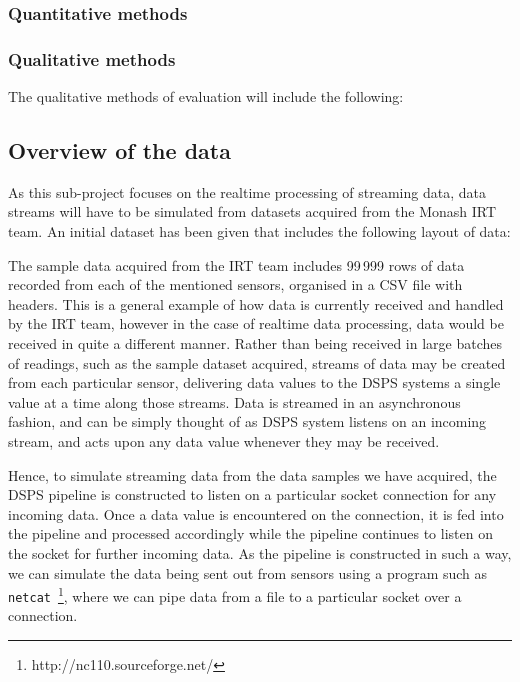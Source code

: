 \subsubsection{Quantitative methods} %
\label{ssub:quantitative_methods}





\subsubsection{Qualitative methods} %
\label{ssub:qualitative_methods}

The qualitative methods of evaluation will include the following:





\subsection{Overview of the data} %
\label{sub:overview_of_the_data}

As this sub-project focuses on the realtime processing of streaming data, data streams will have to be simulated from
datasets acquired from the Monash IRT team. An initial dataset has been given that includes the following layout of data:


The sample data acquired from the IRT team includes 99\,999 rows of data recorded from each of the mentioned sensors,
organised in a CSV file with headers. This is a general example of how data is currently received and handled by the IRT
team, however in the case of realtime data processing, data would be received in quite a different manner. Rather than
being received in large batches of readings, such as the sample dataset acquired, streams of data may be created from
each particular sensor, delivering data values to the DSPS systems a single value at a time along those streams. Data
is streamed in an asynchronous fashion, and can be simply thought of as DSPS system listens on an incoming stream, and
acts upon any data value whenever they may be received.

Hence, to simulate streaming data from the data samples we have acquired, the DSPS pipeline is constructed to listen on
a particular socket connection for any incoming data. Once a data value is encountered on the connection, it is fed into
the pipeline and processed accordingly while the pipeline continues to listen on the socket for further incoming data.
As the pipeline is constructed in such a way, we can simulate the data being sent out from sensors using a program such
as \texttt{netcat}~\footnote{http://nc110.sourceforge.net/}, where we can pipe data from a file to a particular
socket over a connection.

